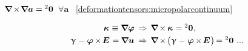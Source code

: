 \label{section:compatibilityequations.cosseratcontinuum}

${\boldnabla \hspace{-0.15ex} \times \hspace{-0.3ex} \boldnabla \bm{a} = \zerobivalent}$~${\forall \bm{a}}$
~\eqref{deformationtensors:micropolarcontinuum}

\nopagebreak\vspace{-0.8em}\begin{equation}
\begin{array}{r@{\hspace{1ex}}c@{\hspace{1ex}}l}
\wrynesstensor \hspace{.16ex} \equiv \boldnabla \fieldofrotations
& \hspace{.1ex} \Rightarrow &
\boldnabla \hspace{-0.15ex} \times \hspace{-0.1ex} \wrynesstensor \hspace{.1ex} = \zerobivalent
\hspace{.1ex} ,
\\[.3em]
%
\distortiontensor \hspace{.1ex} - \hspace{.1ex} \fieldofrotations \hspace{-0.12ex} \times \hspace{-0.25ex} \UnitDyad \hspace{.12ex} = \hspace{-0.1ex} \boldnabla \fieldofdisplacements \hspace{.1ex}
& \hspace{.1ex} \Rightarrow &
\boldnabla \hspace{-0.15ex} \times \hspace{-0.2ex} \bigl(
\distortiontensor \hspace{.1ex} - \hspace{.1ex} \fieldofrotations \hspace{-0.12ex} \times \hspace{-0.25ex} \UnitDyad \hspace{.12ex}
\bigr) \hspace{-0.22ex}
= \zerobivalent
\hspace{.8ex} ...
\end{array}
\end{equation}

